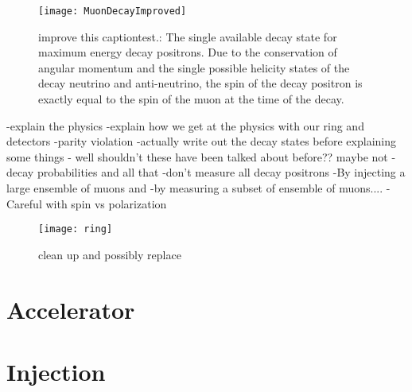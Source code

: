 
\begin{figure}[]
    \centering
    \texttt{[image: MuonDecayImproved]}
    \caption[Muon Decay - Max Energy Positron]{improve this captiontest.: The single available decay state for maximum energy decay positrons. Due to the conservation of angular momentum and the single possible helicity states of the decay neutrino and anti-neutrino, the spin of the decay positron is exactly equal to the spin of the muon at the time of the decay.}
    \label{fig:MuonDecayImproved}
\end{figure}

-explain the physics
-explain how we get at the physics with our ring and detectors
-parity violation
-actually write out the decay states before explaining some things - well shouldn't these have been talked about before?? maybe not
-decay probabilities and all that
-don't measure all decay positrons
-By injecting a large ensemble of muons and 
-by measuring a subset of ensemble of muons....
-Careful with spin vs polarization





\begin{figure}[]
    \centering
    \texttt{[image: ring]}
    \caption[ring]{clean up and possibly replace}   
    \label{fig:ring}
\end{figure}


\section{Accelerator}
\label{sec:Accelerator}




\cite{Stratakis:2017uci}


\section{Injection}
\label{sec:Injection}


